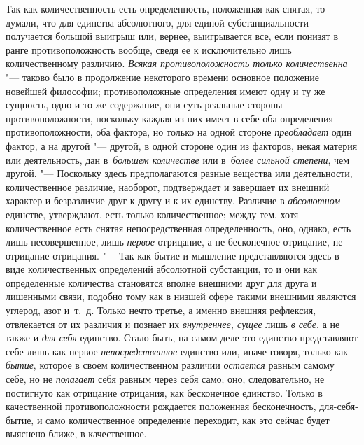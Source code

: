 \label{bkm:bm69a}Так как количественность есть определенность, положенная как
снятая, то думали, что для единства абсолютного, для единой субстанциальности
получается большой выигрыш или, вернее, выигрывается все, если понизят в ранге
противоположность вообще, сведя ее к исключительно лишь количественному
различию. {\em Всякая противоположность только количественна} "--- таково было
в продолжение некоторого времени основное положение новейшей
философии; противоположные определения
имеют одну и ту же сущность, одно и то же содержание, они суть реальные стороны
противоположности, поскольку каждая из них имеет в себе оба определения
противоположности, оба фактора, но только на одной стороне {\em преобладает}
один фактор, а на другой "--- другой, в одной стороне один из факторов, некая
материя или деятельность, дан в~{\em большем количестве} или
в~{\em более сильной степени}, чем другой. "--- Поскольку здесь предполагаются
разные вещества или деятельности, количественное различие, наоборот,
подтверждает и завершает их внешний характер и безразличие друг к другу и к их
единству. Различие в {\em абсолютном} единстве, утверждают, есть только
количественное; между тем, хотя количественное есть снятая непосредственная
определенность, оно, однако, есть лишь несовершенное, лишь {\em первое}
отрицание, а не бесконечное отрицание, не отрицание отрицания. "--- Так как
бытие и мышление представляются здесь в виде количественных определений
абсолютной субстанции, то и они как определенные количества становятся вполне
внешними друг для друга и лишенными связи, подобно тому как в низшей сфере
такими внешними являются углерод, азот и~т.~д. Только нечто третье, а именно
внешняя рефлексия, отвлекается от их различия и познает их
{\em внутреннее, сущее} лишь {\em в себе}, а не также и {\em для себя}
единство. Стало быть, на самом деле это единство представляют себе лишь как
первое {\em непосредственное} единство или, иначе говоря, только как
{\em бытие}, которое в своем количественном различии {\em остается} равным
самому себе, но не {\em полагает} себя равным через себя само; оно,
следовательно, не постигнуто как отрицание отрицания, как бесконечное единство.
Только в качественной противоположности рождается положенная бесконечность,
для-себя-бытие, и само количественное определение переходит, как это сейчас
будет выяснено ближе, в качественное.

